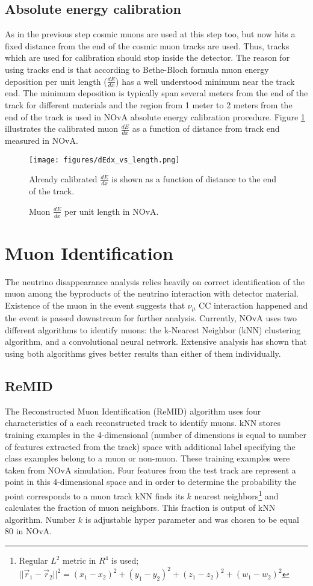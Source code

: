 \subsection{Absolute energy calibration}
As in the previous step cosmic muons are used at this step too, but now hits a fixed distance from the end of the 
cosmic muon tracks are used. Thus, tracks which are used for calibration should stop inside the detector. 
The reason for using tracks end is that according to Bethe-Bloch formula \cite{rpf} muon energy deposition per 
unit length ($\frac{dE}{dx}$) has a well understood minimum near the track end. The minimum deposition is typically
span several meters from the end of the track for different materials and the region from 1 meter to 2 meters from
the end of the track is used in NOvA absolute energy calibration procedure. Figure \ref{fig:dEdx_vs_length} illustrates
the calibrated muon $\frac{dE}{dx}$ as a function of distance from track end measured in NOvA.
\begin{figure}[t]
\texttt{[image: figures/dEdx\_vs\_length.png]}
\caption{Muon $\frac{dE}{dx}$ per unit length in NOvA.}
{Already calibrated $\frac{dE}{dx}$ is shown as a function of distance to the end of the track.}
\label{fig:dEdx_vs_length}
\end{figure}

\section{Muon Identification}
The neutrino disappearance analysis relies heavily on correct identification of the muon among the byproducts of 
the neutrino interaction with detector material. Existence of the muon in the event suggests that $\nu_\mu$ CC interaction
happened and the event is passed downstream for further analysis. Currently, NOvA uses two different algorithms to identify 
muons: the k-Nearest Neighbor (kNN) clustering algorithm, and a convolutional neural network. Extensive analysis 
has shown that using both algorithms gives better results than either of them individually.

\subsection{ReMID}
The Reconstructed Muon Identification (ReMID) algorithm uses four characteristics of a each reconstructed track
to identify muons. kNN stores training examples in the 4-dimensional (number of dimensions
is equal to number of features extracted from the track) space with additional label specifying the class examples
belong to a muon or non-muon. These training examples were taken from NOvA simulation. Four features from the 
test track are represent a point in this 4-dimensional space and in order to determine the probability the point 
corresponds to a muon track kNN finds its $k$ nearest neighbors\footnote{Regular $L^2$ metric in $R^4$ is used;
$||\vec{r}_1 - \vec{r}_2||^2 = (x_1-x_2)^2 + (y_1-y_2)^2 + (z_1-z_2)^2 + (w_1-w_2)^2$} and calculates the 
fraction of muon neighbors. This fraction is output of kNN algorithm. Number $k$ is adjustable hyper parameter 
and was chosen to be equal 80 in NOvA. 

